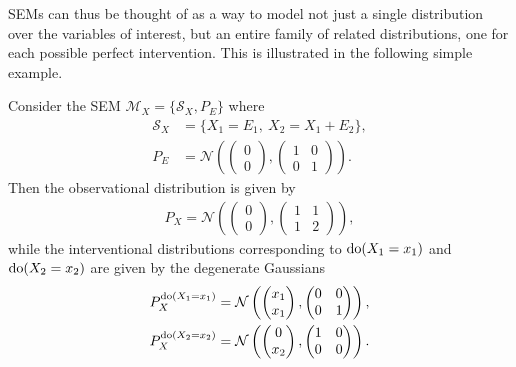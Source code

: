 SEMs can thus be thought of as a way to model not just a single distribution over the variables of interest, but an entire family of related distributions, one for each possible perfect intervention.
This is illustrated in the following simple example.

\medskip

\begin{example}\label{example:causality-simple-sem}
Consider the SEM $\mathcal{M}_X=\{\mathcal{S}_X, P_E\}$ where
%
\begin{align*}
\mathcal{S}_X &= \big\{  X_1 = E_1,\ X_2 = X_1 + E_2\big\}, \\
P_E &= \mathcal{N}\left(\begin{pmatrix}
0 \\
0 
\end{pmatrix}, 
\begin{pmatrix}
1 & 0 \\
0 & 1
\end{pmatrix}\right).
\end{align*}
%
Then the observational distribution is given by 
%
\begin{align*}
P_X = \mathcal{N}\left(\begin{pmatrix}
0 \\
0 
\end{pmatrix}, 
\begin{pmatrix}
1 & 1 \\
1 & 2
\end{pmatrix}\right),
\end{align*}
%
while the interventional distributions corresponding to $\operatorname{do}(X_1 = x_1)$ and $\operatorname{do}(X_2 = x_2)$ are given by the degenerate Gaussians
%
\begin{align*}
P^{\operatorname{do}(X_1 = x_1)}_X &= \mathcal{N}\left(\begin{pmatrix}
x_1 \\
x_1 
\end{pmatrix}, 
\begin{pmatrix}
0 & 0 \\
0 & 1
\end{pmatrix}\right), \\
P^{\operatorname{do}(X_2 = x_2)}_X &= \mathcal{N}\left(\begin{pmatrix}
0 \\
x_2 
\end{pmatrix}, 
\begin{pmatrix}
1 & 0 \\
0 & 0
\end{pmatrix}\right).
\end{align*}
\end{example}

